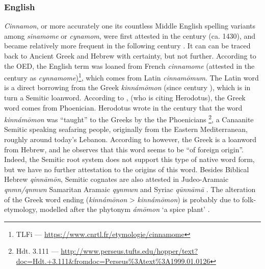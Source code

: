 
\subsubsection{English}
\label{sec:cinnamon_names_en}



\textit{Cinnamon}, or more accurately one its countless Middle English spelling variants among \textit{sinamome} or \textit{cynamom}, were first attested in the  century (ca. 1430), and became relatively more frequent in the following  century . It can can be traced back to Ancient Greek and Hebrew with certainty, but not further. According to the \gls{OED}, the English term was loaned from French \textit{cinnamome} (attested in the  century as \textit{cynnamome})\footnote{\gls{TLFi} --- \url{https://www.cnrtl.fr/etymologie/cinnamome}}, which comes from Latin \textit{cinnamōmum}. The Latin word is a direct borrowing from the Greek  \textit{kinnámōmon} (since  century \BC), which is in turn a Semitic loanword. According to \textcite[701]{beekes_etymological_2010}, (who is citing Herodotus), the Greek word comes from Phoenician. Herodotus wrote in the  century \BC{} that the word \textit{kinnámōmon} was ``taught'' to the Greeks by the the Phoenicians \parencite[139]{herodotus_herodotus_1921}\footnote{Hdt. 3.111 --- \url{http://www.perseus.tufts.edu/hopper/text?doc=Hdt.+3.111&fromdoc=Perseus\%3Atext\%3A1999.01.0126}}, a Canaanite Semitic speaking seafaring people, originally from the Eastern Mediterranean, roughly around today’s Lebanon. According to \textcite[585]{klein_comprehensive_1987} however, the Greek is a loanword from Hebrew, and he observes that this word seems to be ``of foreign origin''. Indeed, the Semitic root system does not support this type of native word form, but we have no further attestation to the origins of this word. Besides Biblical Hebrew 
\textit{qinnāmōn}, Semitic cognates are also attested in Judeo-Aramaic \textit{qnmn/qnmwn} Samaritan Aramaic \textit{qynmwn} and Syriac \textit{qūnnāmā} \parencite{rosol_early_2018}. The alteration of the Greek word ending (\textit{kinnámōnon} > \textit{kinnámōmon}) is probably due to folk-etymology, modelled after the \gls{phytonym}  \textit{ámōmon} `a spice plant' \parencites{beekes_etymological_2010, klein_comprehensive_1987}. 
    
